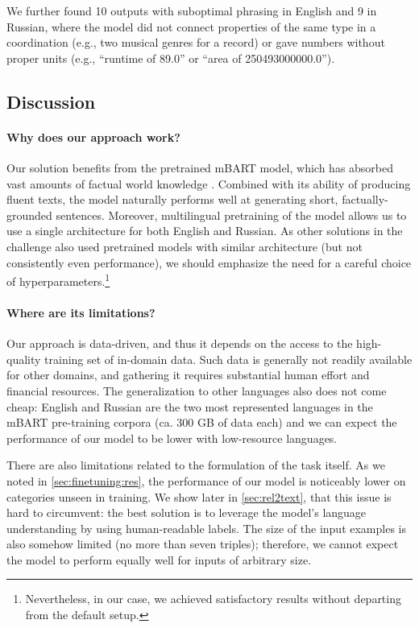 We further found 10 outputs with suboptimal phrasing in English and 9 in Russian, where the model did not connect properties of the same type in a coordination (e.g., two musical genres for a record) or gave numbers without proper  units (e.g., ``runtime of 89.0'' or ``area of 250493000000.0'').

\subsection{Discussion}
\paragraph{Why does our approach work?} Our solution benefits from the pretrained mBART model, which has absorbed vast amounts of factual world knowledge \cite{petroni2019language}. Combined with its ability of producing fluent texts, the model naturally performs well at generating short, factually-grounded sentences. Moreover, multilingual pretraining of the model allows us to use a single architecture for both English and Russian. As other solutions in the challenge also used pretrained models with similar architecture (but not consistently even performance), we should emphasize the need for a careful choice of hyperparameters.\footnote{Nevertheless, in our case, we achieved satisfactory results without departing from the default setup.}

\paragraph{Where are its limitations?} Our approach is data-driven, and thus it depends on the access to the high-quality training set of in-domain data. Such data is generally not readily available for other domains, and gathering it requires substantial human effort and financial resources. The generalization to other languages also does not come cheap: English and Russian are the two most represented languages in the mBART pre-training corpora (ca. 300 GB of data each) and we can expect the performance of our model to be lower with low-resource languages.

There are also limitations related to the formulation of the task itself. As we noted in \autoref{sec:finetuning:res}, the performance of our model is noticeably lower on categories unseen in training.  We show later in \autoref{sec:rel2text}, that this issue is hard to circumvent: the best solution is to leverage the model's language understanding by using human-readable labels. The size of the input examples is also somehow limited (no more than seven triples); therefore, we cannot expect the model to perform equally well for inputs of arbitrary size.

